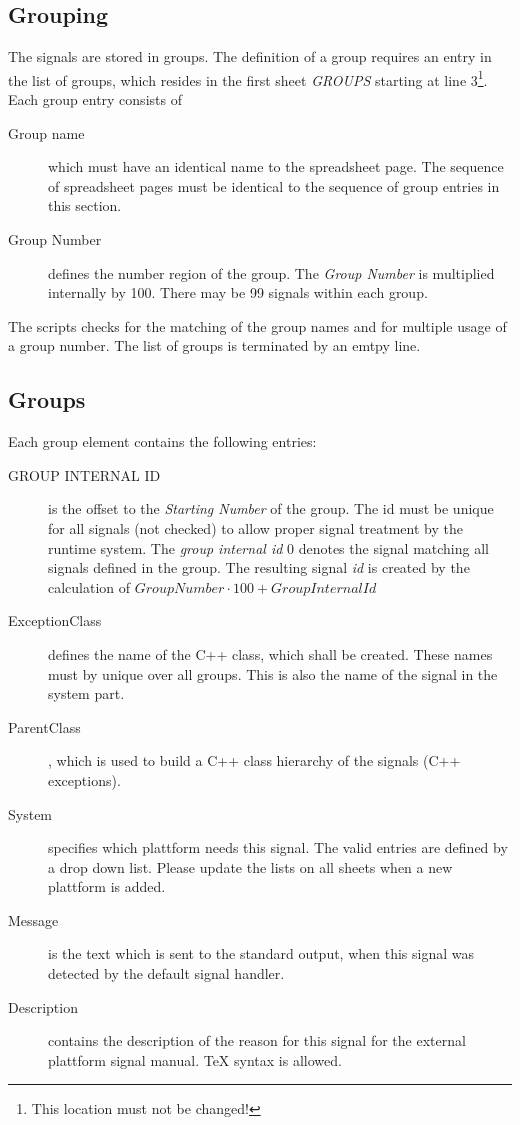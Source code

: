 \subsection{Grouping}
The signals are stored in groups. The definition of a group requires
an entry in the list of groups, which resides in the first sheet {\em GROUPS}
starting at line 3\footnote{This location must not be changed!}.
Each group entry consists of
\begin{description}
\item[Group name] which must have an identical name to the spreadsheet page.
   The sequence of spreadsheet pages must be identical to the sequence of
   group entries in this section.
\item[Group Number] defines the number region of the group.
    The {\em Group Number} is multiplied internally by 100.
    There may be 99 signals within each group.
\end{description}
The scripts checks for the matching of the group names and for multiple
usage of a group number.
The list of groups is terminated by an emtpy line.

\subsection{Groups}
Each group element contains the following entries:
\begin{description}
\item[GROUP INTERNAL ID] is the offset to the {\em Starting Number} of the 
   group. The id must be unique for all signals (not checked) to allow
   proper signal treatment by the runtime system.
   The {\em group internal id} 0 denotes the signal matching
   all signals defined in the group.
   The resulting signal {\em id} is created by the calculation of
   $GroupNumber \cdot 100 + GroupInternalId$
 
\item[ExceptionClass] defines the name of the C++ class, which shall be created.
   These names must by unique over all groups. This is also the name of
   the signal in the system part.
\item[ParentClass], which is used to build a C++ class hierarchy of the
    signals (C++ exceptions).
\item[System] specifies which plattform needs this signal. 
   The valid entries are defined by a drop down list. Please update the lists 
   on all sheets when a new plattform is added.
\item[Message] is the text which is sent to the standard output, when this
    signal was detected by the default signal handler.
\item[Description] contains the description of the reason for this signal
   for the external plattform signal manual. TeX syntax is allowed.
\end{description}

